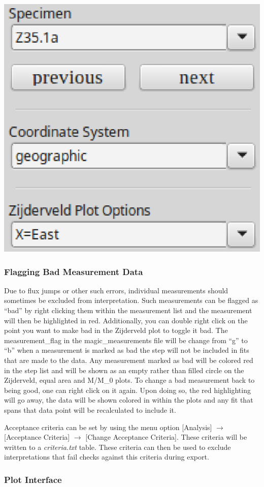 \documentclass[11pt]{book}
\begin{document}
{{\includegraphics[width=5 cm]{EPSFiles/demag_gui_ProjectionChoice.eps}

\subsubsection{Flagging Bad Measurement Data}\label{flagging-bad-measurement-data}

Due to flux jumps or other such errors, individual measurements should sometimes be excluded from interpretation. Such measurements can be flagged as ``bad'' by right clicking them within the measurement list and the measurement will then be highlighted in red. Additionally, you can double right click on the point you want to make bad in the Zijderveld plot to toggle it bad. The measurement\_flag in the magic\_measurements file will be change from ``g'' to ``b'' when a measurement is marked as bad the step will not be included in fits that are made to the data. Any measurement marked as bad will be colored red in the step list and will be shown as an empty rather than filled circle on the Zijderveld, equal area and M/M\_0 plots. To change a bad measurement back to being good, one can right click on it again. Upon doing so, the red highlighting will go away, the data will be shown colored in within the plots and any fit that spans that data point will be recalculated to include it.

\noindent Acceptance criteria can be set by using the menu option [Analysis] $\rightarrow$ [Acceptance
Criteria] $\rightarrow$ [Change Acceptance Criteria]. These criteria will be written to a {\it criteria.txt}  table. These criteria can then be used to exclude interpretations that fail checks against this criteria during export.

\subsubsection{Plot Interface}\label{plot-interface}

}}
\end{document}
